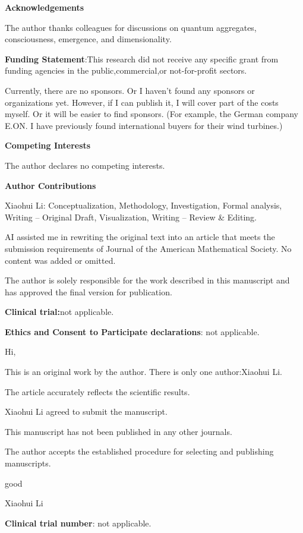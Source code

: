 \documentclass[12pt,a4paper]{article}
\begin{document}
  \textbf{\textbf{Acknowledgements}}

The author thanks colleagues for discussions on quantum aggregates, consciousness, emergence, and dimensionality. 

 \textbf{\textbf{Funding Statement}}:This research did not receive any specific grant from funding agencies in the public,commercial,or not-for-profit sectors.

Currently, there are no sponsors. Or I haven't found any sponsors or organizations yet. However, if I can publish it, I will cover part of the costs myself. Or it will be easier to find sponsors. (For example, the German company E.ON. I have previously found international buyers for their wind turbines.)

 \textbf{\textbf{Competing Interests}}

The author declares no competing interests.

 \textbf{\textbf{Author Contributions}}

Xiaohui Li: Conceptualization, Methodology, Investigation, Formal analysis, Writing – Original Draft, Visualization, Writing – Review \& Editing.

AI assisted me in rewriting the original text into an article that meets the submission requirements of Journal of the American Mathematical Society. No content was added or omitted.

 The author is solely responsible for the work described in this manuscript and has approved the final version for publication.

 \textbf{\textbf{Clinical trial:}}not applicable.

 \textbf{\textbf{Ethics and Consent to Participate declarations}}: not applicable.

 Hi,

This is an original work by the author. There is only one author:Xiaohui Li.

The article accurately reflects the scientific results.

Xiaohui Li agreed to submit the manuscript.

This manuscript has not been published in any other journals.

The author accepts the established procedure for selecting and publishing manuscripts.

good

Xiaohui Li



 \textbf{\textbf{Clinical trial number}}: not applicable.
\end{document}
